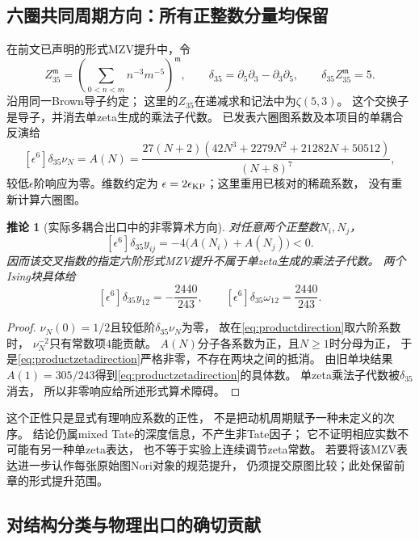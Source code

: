 \documentclass[11pt,a4paper]{ctexart}
\theoremstyle{cnplain}\newtheorem{theorem}{定理}[section]
\newtheorem{corollary}[theorem]{推论}
\theoremstyle{definition}\newtheorem{definition}[theorem]{定义}
\theoremstyle{remark}\newtheorem{remark}[theorem]{注}
\begin{document}
\subsection{六圈共同周期方向：所有正整数分量均保留}

在前文已声明的形式MZV提升中，令
\[
 Z_{35}^{\mathfrak m}=
   \left(\sum_{0<n<m}n^{-3}m^{-5}\right)^{\mathfrak m},\qquad
 \delta_{35}=\partial_5\partial_3-\partial_3\partial_5,\qquad
 \delta_{35}Z_{35}^{\mathfrak m}=5.                         \tag{PC11}
\]
沿用同一Brown导子约定\cite{BrownMZVprod}；
这里的$Z_{35}$在递减求和记法中为$\zeta(5,3)$。
这个交换子是导子，并消去单zeta生成的乘法子代数。
已发表六圈图系数及本项目的单耦合反演给\cite{KPprod}
\[
 [\epsilon^6]\delta_{35}\nu_N=A(N)
 =\frac{27(N+2)(42N^3+2279N^2+21282N+50512)}{(N+8)^7},
                                                               \tag{PC12}\label{eq:ANcritical}
\]
较低$\epsilon$阶响应为零。维数约定为
$\epsilon=2\epsilon_{\rm KP}$；这里重用已核对的稀疏系数，
没有重新计算六圈图。

\begin{corollary}[实际多耦合出口中的非零算术方向]\label{cor:productzeta}
对任意两个正整数$N_i,N_j$，
\[
 [\epsilon^6]\delta_{35}y_{ij}
       =-4\bigl(A(N_i)+A(N_j)\bigr)<0.                \tag{PC13}\label{eq:productzetadirection}
\]
因而该交叉指数的指定六阶形式MZV提升不属于单zeta生成的乘法子代数。
两个Ising块具体给
\[
 [\epsilon^6]\delta_{35}y_{12}=-\frac{2440}{243},
 \qquad
 [\epsilon^6]\delta_{35}\omega_{12}=\frac{2440}{243}. \tag{PC14}
\]
\end{corollary}
\begin{proof}
$\nu_N(0)=1/2$且较低阶$\delta_{35}\nu_N$为零，
故在\eqref{eq:productdirection}取六阶系数时，
$\nu_N^{-2}$只有常数项$4$能贡献。
$A(N)$分子各系数为正，且$N\geq1$时分母为正，
于是\eqref{eq:productzetadirection}严格非零，不存在两块之间的抵消。
由旧单块结果$A(1)=305/243$得到\eqref{eq:productzetadirection}的具体数。
单zeta乘法子代数被$\delta_{35}$消去，
所以非零响应给所述形式算术障碍。
\end{proof}

这个正性只是显式有理响应系数的正性，
不是把动机周期赋予一种未定义的次序。
结论仍属mixed Tate的深度信息，不产生非Tate因子；
它不证明相应实数不可能有另一种单zeta表达，
也不等于实验上连续调节zeta常数。
若要将该MZV表达进一步认作每张原始图Nori对象的规范提升，
仍须提交原图比较；此处保留前章的形式提升范围。

\subsection{对结构分类与物理出口的确切贡献}
\end{document}
